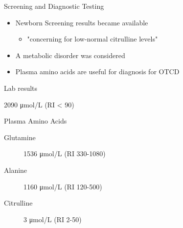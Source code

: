 \documentclass[presentation, smaller]{beamer}
\begin{document}
\begin{frame}[label={sec:orgheadline13}]{Screening and Diagnostic Testing}
\begin{itemize}
\item Newborn Screening results became available
\begin{itemize}
\item "concerning for low-normal citrulline levels"
\end{itemize}
\item A metabolic disorder was considered
\item Plasma amino acids are useful for diagnosis for OTCD
\end{itemize}

\begin{block}{Lab results}
\begin{description}
\item[{Ammonia}] 2090 \si{\micro\mol/\liter} (RI < 90)
\item Plasma Amino Acids
\begin{description}
\item[{Glutamine}] 1536 \si{\micro\mol/\liter} (RI 330-1080)
\item[{Alanine}] 1160 \si{\micro\mol/\liter} (RI 120-500)
\item[{Citrulline}] 3 \si{\micro\mol/\liter} (RI 2-50)
\end{description}
\end{description}
\end{block}
\end{frame}
\end{document}
